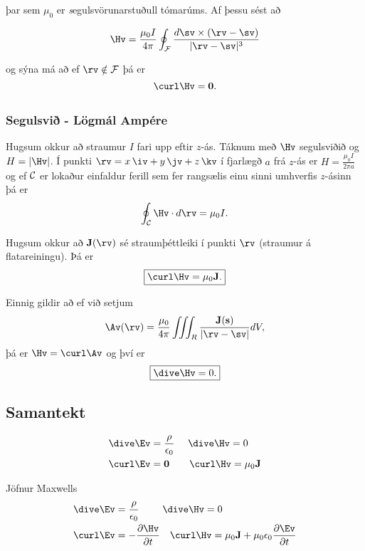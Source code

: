 þar sem $\mu_0$ er {\emph segulsvörunarstuðull} tómarúms. Af þessu sést að 


$$\Hv=\frac{\mu_0 I}{4\pi}\oint_{\cal F}
\frac{d\sv\times(\rv-\sv)}{|\rv-\sv|^3}$$

og sýna má að ef $\rv \notin \mathcal{F}$ þá er $$\curl \Hv = \mathbf{0}.$$







\subsection{} 

\subsubsection{Segulsvið \rtask{} - Lögmál Ampére}
 Hugsum okkur að straumur $I$ fari upp eftir $z$-ás.  Táknum með $\Hv$ segulsviðið og $H=|\Hv|$.  Í punkti  $\rv=x\,\iv+y\,\jv+z\,\kv$ í fjarlægð $a$ frá $z$-ás er $H=\frac{\mu_0 I}{2\pi a}$ og ef $\cal C$ er lokaður einfaldur ferill sem fer rangsælis einu sinni umhverfis $z$-ásinn þá er 
$$\oint_{\cal C} \Hv\cdot d\rv=\mu_0 I.$$

 Hugsum okkur að $\mathbf{J}(\rv)$ sé straumþéttleiki í punkti $\rv$ (straumur á flatareiningu).  Þá er 
$$ \boxed{\curl \Hv = \mu_0 \mathbf{J}.}$$

Einnig gildir að ef við setjum 
$$\Av(\rv)=\frac{\mu_0}{4\pi}\iiint_{R}
\frac{\mathbf{J}(\mathbf{s})}{|\rv-\sv|}dV,$$
þá er $\Hv=\curl \Av$  og því er $$\boxed{\dive \Hv=0.}$$


\subsection{Samantekt}
 \begin {align*}
  \dive \Ev &= \frac{\rho}{\epsilon_0} \quad~ \dive \Hv = 0 \\
  \curl \Ev &= \mathbf{0} \qquad \curl \Hv = \mu_0 \mathbf{J}
 \end {align*}

 Jöfnur Maxwells
 \begin {align*}
  \dive \Ev &= \frac{\rho}{\epsilon_0} \qquad ~ \dive \Hv = 0 \\
  \curl \Ev &= -\frac{\partial \Hv}{\partial t} \quad \curl \Hv = \mu_0 \mathbf{J} + \mu_0 \epsilon_0  \frac{\partial\Ev}{\partial t}
 \end {align*}





